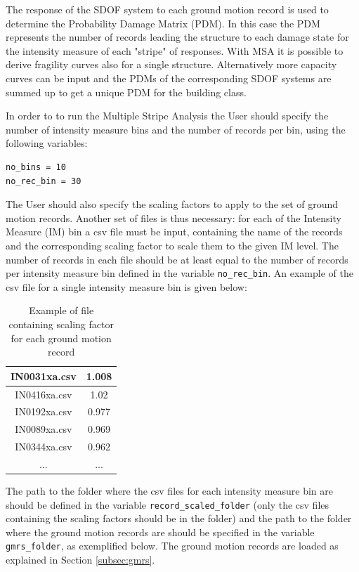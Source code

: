 The response of the SDOF system to each ground motion record is used to determine the Probability Damage Matrix (PDM). In this case the PDM represents the number of records leading the structure to each damage state for the intensity measure of each "stripe" of responses. With MSA it is possible to derive fragility curves also for a single structure. Alternatively more capacity curves can be input and the PDMs of the corresponding SDOF systems are summed up to get a unique PDM for the building class.

In order to to run the Multiple Stripe Analysis the User should specify the number of intensity measure bins and the number of records per bin, using the following variables:

\begin{Verbatim}[frame=single, commandchars=\\\{\}, samepage=true]
no_bins = 10
no_rec_bin = 30
\end{Verbatim}

The User should also specify the scaling factors to apply to the set of ground motion records. Another set of files is thus necessary: for each of the Intensity Measure (IM) bin a csv file must be input, containing the name of the records and the corresponding scaling factor to scale them to the given IM level. The number of records in each file should be at least equal to the number of records per intensity measure bin defined in the variable \verb=no_rec_bin=. An example of the csv file for a single intensity measure bin is given below:

\begin {table}[htb]
\caption{Example of file containing scaling factor for each ground motion record}
\label{table:pinching4}
\begin{center}
  \begin{tabular}{ | c | c |}
  \hline
	IN0031xa.csv & 1.008\\ \hline
	IN0416xa.csv & 1.02\\ \hline
	IN0192xa.csv & 0.977\\ \hline
	IN0089xa.csv & 0.969\\ \hline
	IN0344xa.csv & 0.962\\ \hline
	... & ... \\ \hline
	\end{tabular}
\end{center}
\end{table}

The path to the folder where the csv files for each intensity measure bin are should be defined in the variable \verb=record_scaled_folder= (only the csv files containing the scaling factors should be in the folder) and the path to the folder where the ground motion records are should be specified in the variable \verb=gmrs_folder=, as exemplified below. The ground motion records are loaded as explained in Section \ref{subsec:gmrs}.

